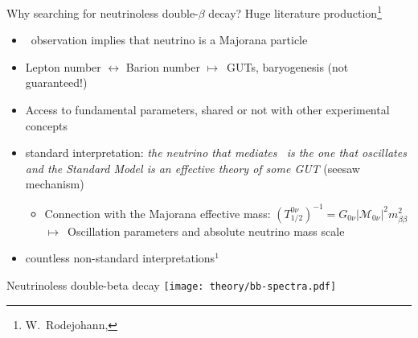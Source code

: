\documentclass[10pt,aspectratio=169]{beamer}
\newcommand{\arrow}{$\longmapsto$}
\begin{document}
\begin{frame}{Why searching for neutrinoless double-$\beta$ decay?}
  Huge literature production\footnote{W.~Rodejohann, }
  \begin{itemize}
    \item \onbb\ observation implies that neutrino is a \alert{Majorana particle}
    \item Lepton number $\longleftrightarrow$ Barion number \arrow\
      \alert{GUTs}, \alert{baryogenesis} (not guaranteed!)
    \item Access to fundamental parameters, shared or not with other
      experimental concepts
    \item \alert{standard interpretation}: \emph{the neutrino that mediates
      \onbb\ is the one that oscillates and the Standard Model is an effective
      theory of some GUT} (seesaw mechanism)
    \begin{itemize}
      \item Connection with the Majorana effective mass:
        $(T^{0\nu}_{1/2})^{-1}=G_{0\nu} |\mathcal{M}_{0\nu}|^2 m_{\beta\beta}^2$
        \arrow\ Oscillation parameters and absolute neutrino mass scale
    \end{itemize}
  \item countless non-standard interpretations$^1$
  \end{itemize}
\end{frame}
\begin{frame}{Neutrinoless double-beta decay}
  \texttt{[image: theory/bb-spectra.pdf]}
\end{frame}
\end{document}
